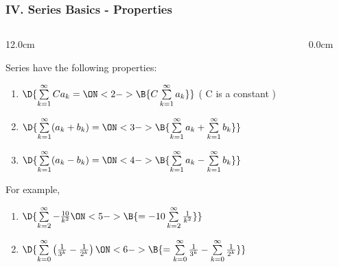 \begin{frame}
\frametitle{IV. Series Basics - Properties}
\scriptsize
\begin{columns}
\begin{column}{12.0cm}

Series have the following properties:

\vspace{0.3cm}

\begin{enumerate}
	\item $\D{\sum \limits_{k=1}^{\infty} C a_k = \ON<2->{\B{C \sum \limits_{k=1}^{\infty} a_k}}}$  \qquad ( C is a constant )
	\vspace{0.1cm}
	\item $\D{\sum \limits_{k=1}^{\infty} ( a_k + b_k ) = \ON<3->{\B{\sum \limits_{k=1}^{\infty} a_k + \sum \limits_{k=1}^{\infty} b_k}}}$
	\vspace{0.1cm}
	\item $\D{\sum \limits_{k=1}^{\infty} ( a_k - b_k ) = \ON<4->{\B{\sum \limits_{k=1}^{\infty} a_k - \sum \limits_{k=1}^{\infty} b_k}}}$
\end{enumerate}

\vspace{0.2cm}

For example,

\vspace{0.2cm}

\begin{enumerate}
	\item $\D{\sum \limits_{k=2}^{\infty} -\frac{10}{k^2} \ON<5->{\B{ = -10 \sum \limits_{k=2}^{\infty} \frac{1}{k^2}}}}$
	\vspace{0.1cm}
	\item $\D{\sum \limits_{k=0}^{\infty} \left(\frac{1}{3^k} - \frac{1}{2^k}\right) \ON<6->{\B{= \sum \limits_{k=0}^{\infty} \frac{1}{3^k} - \sum \limits_{k=0}^{\infty} \frac{1}{2^k}}}}$
\end{enumerate}

\end{column}
\begin{column}{0.0cm}\end{column}
\end{columns}
\end{frame}

